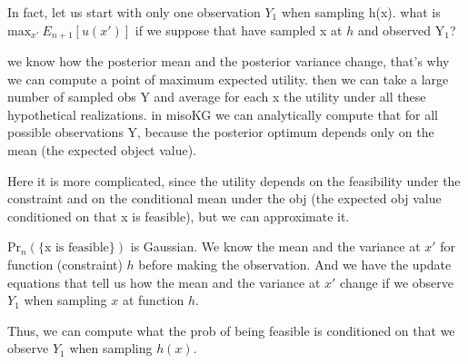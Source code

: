\documentclass[12pt]{article}
\begin{document}
In fact, let us start with only one observation $Y_1$ when sampling h(x). what is $\text{max}_{x'}\  E_{n+1}[u(x')]$ if we suppose that have sampled x at $h$ and observed $\text{Y}_1$?

we know how the posterior mean and the posterior variance change, that's why we can compute a point of maximum expected utility. then we can take a large number of sampled obs Y and average for each x the utility under all these hypothetical realizations. in misoKG we can analytically compute that for all possible observations Y, because the posterior optimum depends only on the mean (the expected object value).

Here it is more complicated, since the utility depends on the feasibility under the constraint and on the conditional mean under the obj (the expected obj value conditioned on that x is feasible), but we can approximate it.

$\text{Pr}_n(\{\text{x is feasible}\})$ is Gaussian. We know the mean and the variance at $x'$ for function (constraint) $h$ before making the observation.
And we have the update equations that tell us how the mean and the variance at $x'$ change if we observe $Y_1$ when sampling $x$ at function $h$.


Thus, we can compute what the prob of being feasible is conditioned on that we observe $Y_1$ when sampling $h(x)$.
\end{document}
